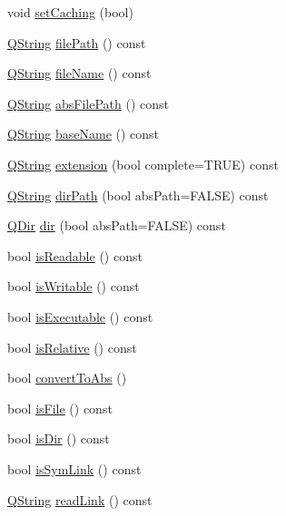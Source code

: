 \begin{DoxyCompactItemize}
\item 
void \hyperlink{class_q_file_info_a8a46b4f27823541c047dd5b6a79a7922}{set\-Caching} (bool)
\item 
\hyperlink{class_q_string}{Q\-String} \hyperlink{class_q_file_info_a679696ce1d5dd8af8b0ea0d1b445fd9a}{file\-Path} () const 
\item 
\hyperlink{class_q_string}{Q\-String} \hyperlink{class_q_file_info_a5a82962b4e77435323352ef77597016a}{file\-Name} () const 
\item 
\hyperlink{class_q_string}{Q\-String} \hyperlink{class_q_file_info_af8137ee22710784ca6540e4057a2c3d6}{abs\-File\-Path} () const 
\item 
\hyperlink{class_q_string}{Q\-String} \hyperlink{class_q_file_info_ad10cd0bec2e0d1564a4a1d9fe96f7042}{base\-Name} () const 
\item 
\hyperlink{class_q_string}{Q\-String} \hyperlink{class_q_file_info_af470f8039a0984ce84547d82b6ab45b7}{extension} (bool complete=T\-R\-U\-E) const 
\item 
\hyperlink{class_q_string}{Q\-String} \hyperlink{class_q_file_info_a97f218d1a33a366ca72d14ec11e578c0}{dir\-Path} (bool abs\-Path=F\-A\-L\-S\-E) const 
\item 
\hyperlink{class_q_dir}{Q\-Dir} \hyperlink{class_q_file_info_addd0c986149f1ee0a42d113716663248}{dir} (bool abs\-Path=F\-A\-L\-S\-E) const 
\item 
bool \hyperlink{class_q_file_info_a3d7f091ba732d3899bcb34dde9fbfd63}{is\-Readable} () const 
\item 
bool \hyperlink{class_q_file_info_aa741717fa726eea03300fdde9934808a}{is\-Writable} () const 
\item 
bool \hyperlink{class_q_file_info_ac652647e67dfa6a70d50017b9e7f0355}{is\-Executable} () const 
\item 
bool \hyperlink{class_q_file_info_ad6802e0e235015f0503e36db60d819e8}{is\-Relative} () const 
\item 
bool \hyperlink{class_q_file_info_a312d45c83379661a153c7b67041b0035}{convert\-To\-Abs} ()
\item 
bool \hyperlink{class_q_file_info_aee673f3d8abf2d1bfd841274900fd40a}{is\-File} () const 
\item 
bool \hyperlink{class_q_file_info_a50918fb073b73ccef883870dfb705d74}{is\-Dir} () const 
\item 
bool \hyperlink{class_q_file_info_ad62ce98859b45d7505e98904c7350138}{is\-Sym\-Link} () const 
\item 
\hyperlink{class_q_string}{Q\-String} \hyperlink{class_q_file_info_aa4681f99a2d85161b319384777907bfd}{read\-Link} () const 

\end{DoxyCompactItemize}
